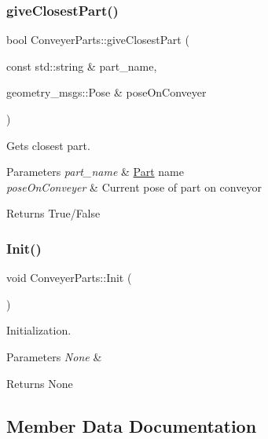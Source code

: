 \subsubsection{\texorpdfstring{give\+Closest\+Part()}{giveClosestPart()}}
{\footnotesize\ttfamily bool Conveyer\+Parts\+::give\+Closest\+Part (\begin{DoxyParamCaption}\item[{const std\+::string \&}]{part\+\_\+name,  }\item[{geometry\+\_\+msgs\+::\+Pose \&}]{pose\+On\+Conveyer }\end{DoxyParamCaption})}



Gets closest part. 


\begin{DoxyParams}{Parameters}
{\em part\+\_\+name} & \hyperlink{structPart}{Part} name \\
\hline
{\em pose\+On\+Conveyer} & Current pose of part on conveyor \\
\hline
\end{DoxyParams}
\begin{DoxyReturn}{Returns}
True/\+False 
\end{DoxyReturn}
\mbox{\label{classConveyerParts_ab701aac222b631fdf7a1d2a3465eaa67}} 
\subsubsection{\texorpdfstring{Init()}{Init()}}
{\footnotesize\ttfamily void Conveyer\+Parts\+::\+Init (\begin{DoxyParamCaption}{ }\end{DoxyParamCaption})}



Initialization. 


\begin{DoxyParams}{Parameters}
{\em None} & \\
\hline
\end{DoxyParams}
\begin{DoxyReturn}{Returns}
None 
\end{DoxyReturn}


\subsection{Member Data Documentation}
\mbox{\label{classConveyerParts_ab75ade698ffee71ccf3792d22917eb95}} 
